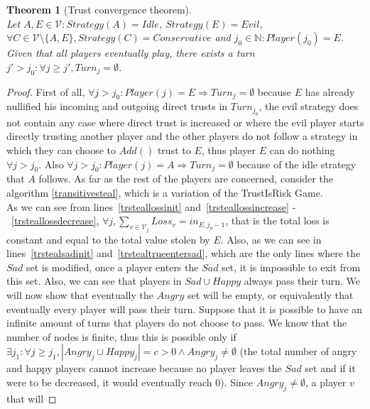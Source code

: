 \documentclass[11pt]{article}
\newtheorem{theorem}{Theorem}[section]
\theoremstyle{definition}
\theoremstyle{corollary}
\theoremstyle{lemma}
\begin{document}
    \begin{theorem}[Trust convergence theorem] \ \\
    \label{convergence}
       Let $A,E \in \mathcal{V} : Strategy(A) = Idle$, $Strategy(E) = Evil$, $\forall C \in \mathcal{V} \setminus \{A,E\},
       Strategy(C) = Conservative$ and $j_0 \in \mathbb{N} : Player(j_0) = E$. Given that all players eventually play, there
       exists a turn $j' > j_0 : \forall j \geq j', Turn_j = \emptyset$.
    \end{theorem}
    \begin{proof}
       First of all, $\forall j > j_0 : Player(j) = E \Rightarrow Turn_j = \emptyset$ because $E$ has already nullified his
       incoming and outgoing direct trusts in $Turn_{j_0}$, the evil strategy does not contain any case where direct trust is
       increased or where the evil player starts directly trusting another player and the other players do not follow a
       strategy in which they can choose to $Add()$ trust to $E$, thus player $E$ can do nothing $\forall j > j_0$. Also
       $\forall j > j_0 : Player(j) = A \Rightarrow Turn_j = \emptyset$ because of the idle strategy that $A$ follows. As far
       as the rest of the players are concerned, consider the algorithm \ref{transitivesteal}, which is a variation of the
       TrustIsRisk Game. \\
       As we can see from lines~\ref{trsteallossinit} and~\ref{trsteallossincrease} -~\ref{trsteallossdecrease}, $\forall j,
       \sum\limits_{v \in \mathcal{V}_j}Loss_v = in_{E, j_0-1}$, that is the total loss is constant and equal to the total
       value stolen by $E$. Also, as we can see in lines~\ref{trstealsadinit} and~\ref{trstealtrueentersad}, which are the
       only lines where the $Sad$ set is modified, once a player enters the $Sad$ set, it is impossible to exit from this
       set. Also, we can see that players in $Sad \cup Happy$ always pass their turn. We will now show that eventually the
       $Angry$ set will be empty, or equivalently that eventually every player will pass their turn. Suppose that it is
       possible to have an infinite amount of turns that players do not choose to pass. We know that the number of nodes is
       finite, thus this is possible only if $\exists j_1: \forall j \geq j_1, |Angry_j \cup Happy_j| = c > 0 \wedge Angry_j
       \neq \emptyset$ (the total number of angry and happy players cannot increase because no player leaves the $Sad$ set
       and if it were to be decreased, it would eventually reach 0). Since $Angry_j \neq \emptyset$, a player $v$ that will

\end{proof}
\end{document}

